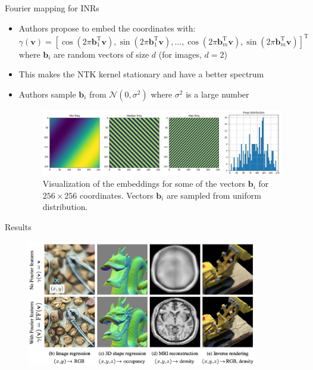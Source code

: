 \documentclass[handout, 10pt]{beamer}
\begin{document}
\begin{frame}{Fourier mapping for INRs}
    \begin{itemize}
        \item\pause Authors propose to embed the coordinates with:
        \begin{equation*}
\gamma(\mathbf{v})=\left[\cos \left(2 \pi \mathbf{b}_{1}^{\mathrm{T}} \mathbf{v}\right), \sin \left(2 \pi \mathbf{b}_{1}^{\mathrm{T}} \mathbf{v}\right), \ldots, \cos \left(2 \pi \mathbf{b}_{m}^{\mathrm{T}} \mathbf{v}\right), \sin \left(2 \pi \mathbf{b}_{m}^{\mathrm{T}} \mathbf{v}\right)\right]^{\mathrm{T}}
\end{equation*}
        where $\bm b_i$ are random vectors of size $d$ (for images, $d=2$)
        \item\pause This makes the NTK kernel stationary and have a better spectrum
        \item\pause Authors sample $\bm b_i$ from $\mathcal{N}(0, \sigma^2)$ where $\sigma^2$ is a large number
        \begin{figure}
            \centering
            \includegraphics[width=\textwidth]{images/embedding-example}
            \caption{Visualization of the embeddings for some of the vectors $\bm b_i$ for $256 \times 256$ coordinates. Vectors $\bm b_i$ are sampled from uniform distribution.}
        \end{figure}
    \end{itemize}
\end{frame}

\begin{frame}{Results}
    \begin{figure}
        \centering
        \includegraphics[width=0.9\textwidth]{images/results}
    \end{figure}
\end{frame}
\end{document}
